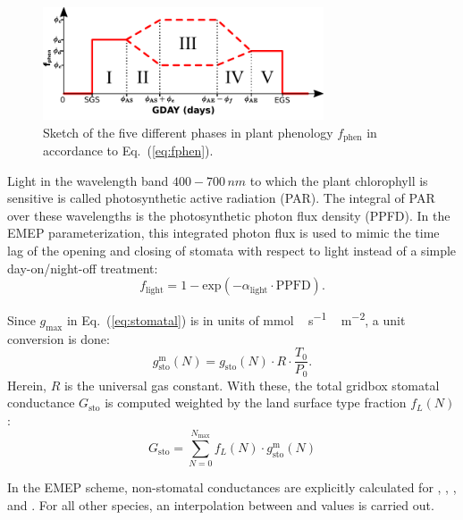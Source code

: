 \documentclass[gmd, manuscript]{copernicus}
\begin{document}
%
\begin{figure}[t]
  \includegraphics[width=8.3cm]{fig01}
  \caption{Sketch of the five different phases in plant phenology $f_\text{phen}$ in accordance to Eq.~(\ref{eq:fphen}).}
  \label{fig:phenology}
\end{figure}

Light in the wavelength band $400-700\,\unit{nm}$ to which the plant chlorophyll is sensitive is called photosynthetic active radiation (PAR). The integral of PAR over these wavelengths is the photosynthetic photon flux density (PPFD). In the EMEP parameterization, this integrated photon flux is used to mimic the time lag of the opening and closing of stomata with respect to light instead of a simple day-on/night-off treatment:
\begin{equation}
  f_\text{light} = 1-\text{exp}(-\alpha_\text{light}\cdot \text{PPFD}).
  \label{eq:flight}
\end{equation}

Since $g_\text{max}$ in Eq.~(\ref{eq:stomatal}) is in units of \unit{mmol\,s^{-1}\,m^{-2}}, a unit conversion is done:
\begin{equation}
  g^\text{m}_{\text{sto}}(N) = g_{\text{sto}}(N) \cdot R \cdot \frac{T_0}{P_0}.
\end{equation}
Herein, $R$ is the universal gas constant. With these, the total gridbox stomatal conductance $G_\text{sto}$ is computed weighted by the land surface type fraction $f_L(N)$:
\begin{equation}
  G_\text{sto} = \sum_{N=0}^{N_\text{max}} f_L(N)\cdot g^\text{m}_{\text{sto}}(N)
\end{equation}

In the EMEP scheme, non-stomatal conductances are explicitly calculated for , , , and . For all other species, an interpolation between  and  values is carried out.
\end{document}
